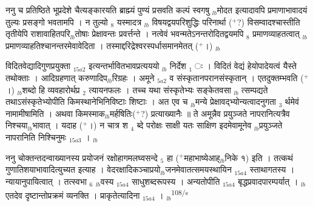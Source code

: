 \documentclass[article,12pt,a4paper]{memoir}%
\newcommand{\add}[1]{($^{+}$#1)}
\newcounter{parCount}
\begin{document}
	  
	  \pstart \leavevmode%
	\hphantom{.}ननु च प्रतिष्ठिते भूप्रदेशे चैत्यङ्कारयति ब्राह्म्यं पुण्यं प्रसवति कल्पं स्वगषु {\tiny $_{lb}$}मोदत इत्यादावपि प्रमाणाभावादयं तुल्यः प्रसङ्गो भवतामपि । न तुल्यो {\tiny $_{8}$} यस्मादत्र {\tiny $_{lb}$} \leavevmode{} विषयद्वयपरिशुद्धिः परिनार्था \add{?} विसम्वादश्चास्तीति तृतीयेपि राशावाहितपरि{\tiny $_{lb}$}तोषाः प्रेक्षावन्तः प्रवर्त्तन्ते । नत्वेवं भवन्मतेऽनन्तरोदितद्वयमपि {\tiny $_{8}$} \leavevmode{} प्रमाणव्याहतत्वात् {\tiny $_{lb}$}प्रमाणव्याहतिश्चानन्तरमेवावेदिता । तस्माद्दरिद्रेश्वरस्पर्धासमानमेतत् \add{।}
	{}
	\pend%
      {\tiny $_{lb}$}

	  
	  \pstart \leavevmode%
	विदितवेद्यादिगुणप्रयुक्ता {\tiny $_{15a2}$} इत्यन्तर्भावितभावप्रत्यययो {\tiny $_{lb}$} {\color{DodgerBlue3}निर्देश {\tiny $_{1}$} ः} । विदितं वेद्यं हेयोपादेयत्वं यैस्ते तथोक्ताः । आदिग्रहणात् करुणादिप{\tiny $_{lb}$}रिग्रहः । अमूने {\tiny $_{5a2}$} व संस्कृतानपरानसंस्कृतान् । एतदुक्तम्भवति \add{।} {\tiny $_{lb}$}शब्दो हि व्यवहारोर्थप्र {\tiny $_{2}$} त्यायनफलः । तच्च यथा संस्कृतेभ्यः सङ्केतवसा {\tiny $_{lb}$} त्सम्पद्यते तथाऽसंस्कृतेभ्योपीति किमस्थानेभिनिविष्टाः शिष्टाः । अत एव च {\tiny $_{lb}$}मन्ये प्रेक्षावद्भ्योन्यत्वादनुगता {\tiny $_{3}$} र्थमेवं नामामीषामिति । अथवा किमस्माक{\tiny $_{lb}$}मर्हषितिः\add{?} प्रत्याख्यानैः ॥ ते अमून्नैव प्रयुञ्जते नापरानित्यत्रैव निश्चया{\tiny $_{lb}$}भावात् । यदाह \add{।} न चात्र श {\tiny $_{4}$} ब्दे परोक्षः साक्षी यतः साक्षिण इदमेवामूनेव {\tiny $_{lb}$}प्रयुञ्जते नापरानिति निश्चिनुमः {\tiny $_{15a3}$} ।
	{}
	\pend%
      {\tiny $_{lb}$}

	  
	  \pstart \leavevmode%
	\hphantom{.}ननु चोक्तन्तदन्वाख्यानस्य प्रयोजनं {\color{DodgerBlue3}रक्षोहागमलघ्वसन्दे {\tiny $_{5}$} हा} \add{महाभाष्येआह्{\tiny $_{lb}$}निके १} इति । तत्कथं गुणातिशयाभावादित्युच्यत इत्याह । {\color{DodgerBlue3}वेदरक्षादिकञ्चाप्रयो{\tiny $_{lb}$}जनमेवातत्समयस्थायिन} {\tiny $_{15a4}$} स्ताथागतस्य । न्यायानुपायित्वात् । तत्स्वभा {\tiny $_{6}$} {\tiny $_{lb}$}वस्य {\tiny $_{15a4}$} साधुशब्दरूपस्य । अन्यतोपीति {\tiny $_{15a4}$} बृद्धप्रवादपारम्पर्यात् । {\tiny $_{lb}$}एतदेव दृष्टान्तोप्रक्रमं व्यनक्ति । {\color{DodgerBlue3}प्राकृतेत्यादिना} {\tiny $_{15a4}$} ।
	{}
	\pend%
      {\tiny $_{lb}$}\textsuperscript{\textenglish{108/s}}
\end{document}
